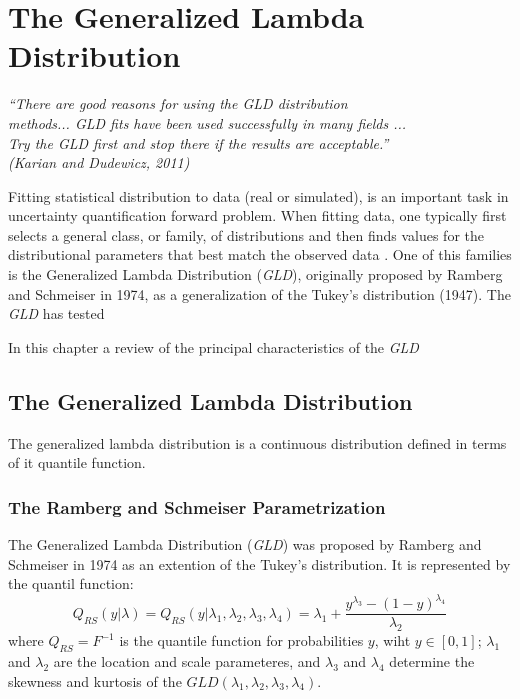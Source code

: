 \chapter[The Generalized Lambda Distribution]{The Generalized Lambda Distribution}\label{cap:gld}

\begin{flushright}
	\textit{``There are good reasons for using the GLD distribution \\
	methods... GLD fits have been used successfully in many fields ...\\
	Try the GLD first and stop there if the results are acceptable.''\\
	(Karian and Dudewicz, 2011)}
\end{flushright}


Fitting statistical distribution to data (real or simulated), is an important task in uncertainty quantification forward problem. When fitting data, one typically first selects a general class, or family, of distributions and then finds values for the distributional parameters that best match the observed data \cite{Lakhany2000}. One of this families is the Generalized Lambda Distribution (\textit{GLD}), originally proposed by Ramberg and Schmeiser in 1974, as a generalization of the Tukey's distribution (1947). The \textit{GLD} has tested 

In this chapter a review of the principal characteristics of the \textit{GLD}

\section{The Generalized Lambda Distribution}

The generalized lambda distribution is a continuous distribution defined in terms of it quantile function. 

\subsection{The Ramberg and Schmeiser Parametrization}\label{sub:rs_gld}
The Generalized Lambda Distribution (\textit{GLD}) was proposed by Ramberg and Schmeiser in 1974 as an extention of the Tukey's distribution. It is represented by the quantil function:
\begin{equation}\label{eq:rs_param}
Q_{RS}(y|\lambda)=Q_{RS}(y|\lambda_{1}, \lambda_{2}, \lambda_{3}, \lambda_{4})=\lambda_{1}+\frac{y^{\lambda_{3}}-(1-y)^{\lambda_{4}}}{\lambda_{2}}
\end{equation}
where $Q_{RS}=F^{-1}$ is the quantile function for probabilities $y$, wiht $y\in[0,1]$; $\lambda_{1}$ and $\lambda_{2}$ are the location and scale parameteres, and $\lambda_{3}$ and $\lambda_{4}$ determine the skewness and kurtosis of the $GLD(\lambda_{1}, \lambda_{2}, \lambda_{3}, \lambda_{4})$.

